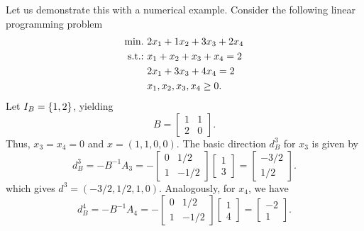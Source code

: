 Let us demonstrate this with a numerical example. Consider the following linear programming problem
%
\begin{align*}
	\mathop{\text{min.~}} & 2x_1 + 1x_2 + 3x_3 + 2x_4 \\	
	\mathop{\text{s.t.:~}} & x_1 + x_2 + x_3 + x_4 = 2 \\
	& 2x_1 + 3x_3 + 4x_4 = 2 \\
	& x_1, x_2 ,x_3, x_4 \geq 0.  
\end{align*}  
%
Let $I_B = \left\{ 1,2 \right \}$, yielding
% 
\begin{equation*}
	B = \begin{bmatrix}
    		1 & 1 \\
    		2 & 0
    	\end{bmatrix}.
\end{equation*} 
%
Thus, $x_3= x_4 =0$ and $x = (1,1,0,0)$. The basic direction $d_B^3$ for $x_3$ is given by
%
\begin{equation*}
    d_B^3 = -B^{-1}A_3 = -\begin{bmatrix}
    	0 & 1/2 \\
    	1 & -1/2
    \end{bmatrix} \begin{bmatrix}
    	1 \\ 3
    \end{bmatrix} = \begin{bmatrix}
    	-3/2 \\ 1/2
    \end{bmatrix}.
\end{equation*}
%
which gives $d^3 = (-3/2, 1/2, 1, 0)$. Analogously, for $x_4$, we have
%
\begin{equation*}
    d_B^4 = -B^{-1}A_4 = -\begin{bmatrix}
    	0 & 1/2 \\
    	1 & -1/2
    \end{bmatrix} \begin{bmatrix}
    	1 \\ 4
    \end{bmatrix} = \begin{bmatrix}
    	-2 \\ 1
    \end{bmatrix}.
\end{equation*}

